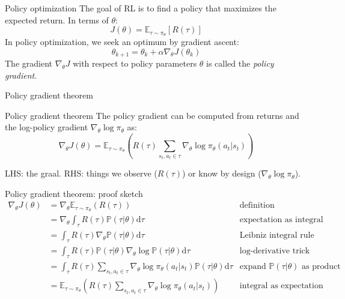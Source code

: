 \documentclass[10pt, aspectratio=1610]{beamer}
\begin{document}
\begin{frame}{Policy optimization}
    The goal of RL is to find a policy that maximizes the expected return. In terms of $\theta$:
    $$
    J(\theta) = \mathbb{E}_{\tau \sim \pi_\theta}[R(\tau)]
    $$
    In policy optimization, we seek an optimum by gradient ascent:
    $$
    \theta_{k+1} = \theta_k + \alpha \nabla_\theta J(\theta_k)
    $$
    The gradient $\nabla_\theta J$ with respect to policy parameters $\theta$ is called the \emph{policy gradient}.
\end{frame}

\begin{frame}{Policy gradient theorem}
    \begin{block}{Policy gradient theorem}
        The policy gradient can be computed from returns and the log-policy gradient $\nabla_\theta \log \pi_\theta$ as:
        \begin{equation*}
            \nabla_\theta J(\theta) = \mathbb{E}_{\tau \sim \pi_\theta} \left(
            R(\tau)
            \sum_{s_t, a_t \in \tau} \nabla_\theta \log \pi_\theta(a_t | s_t)
            \right)
        \end{equation*}
    \end{block}
    LHS: the graal. RHS: things we observe ($R(\tau)$) or know by design ($\nabla_\theta \log \pi_\theta$).
\end{frame}

\begin{frame}{Policy gradient theorem: proof sketch}
    \begin{align*}
        \nabla_{\theta} J(\theta)
        & = \nabla_{\theta} \mathbb{E}_{\tau \sim \pi_{\theta}}(R(\tau)) & \text{definition} \\
        & = \nabla_{\theta} \int_{\tau} R(\tau) \mathbb{P}(\tau|\theta) \mathrm{d}\tau & \text{expectation as integral} \\
        & = \int_{\tau} R(\tau) \nabla_{\theta} \mathbb{P}(\tau|\theta) \mathrm{d}\tau & \text{Leibniz integral rule} \\
        & = \int_{\tau} R(\tau) \mathbb{P}(\tau|\theta) \nabla_{\theta} \log \mathbb{P}(\tau|\theta) \mathrm{d}\tau & \text{log-derivative trick} \\
        & = \int_{\tau} R(\tau) \sum_{s_t, a_t \in \tau} \nabla_\theta \log \pi_\theta(a_t | s_t) \mathbb{P}(\tau|\theta) \mathrm{d}\tau & \text{expand $\mathbb{P}(\tau|\theta)$ as product} \\
        & = \mathbb{E}_{\tau \sim \pi_{\theta}} \left(R(\tau) \sum_{s_t, a_t \in \tau} \nabla_\theta \log \pi_\theta(a_t | s_t)\right) & \text{integral as expectation}
    \end{align*}
\end{frame}
\end{document}
